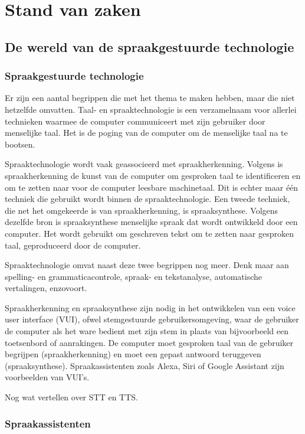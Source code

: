 \chapter{Stand van zaken}
\label{ch:stand-van-zaken}
\section{De wereld van de spraakgestuurde technologie}
\subsection{Spraakgestuurde technologie}
Er zijn een aantal begrippen die met het thema te maken hebben, maar die niet hetzelfde omvatten. Taal- en spraaktechnologie is een verzamelnaam voor allerlei technieken waarmee de computer communiceert met zijn gebruiker door menselijke taal.\autocite{Taalunie2017} Het is de poging van de computer om de menselijke taal na te bootsen.

Spraaktechnologie wordt vaak geassocieerd met spraakherkenning. Volgens \autocite{Rouse2016} is spraakherkenning de kunst van de computer om gesproken taal te identificeren en om te zetten naar voor de computer leesbare machinetaal. Dit is echter maar één techniek die gebruikt wordt binnen de spraaktechnologie. Een tweede techniek, die net het omgekeerde is van spraakherkenning, is spraaksynthese. Volgens dezelfde bron is spraaksynthese menselijke spraak dat wordt ontwikkeld door een computer. Het wordt gebruikt om geschreven tekst om te zetten naar gesproken taal, geproduceerd door de computer.

Spraaktechnologie omvat naast deze twee begrippen nog meer. Denk maar aan spelling- en grammaticacontrole, spraak- en tekstanalyse, automatische vertalingen, enzovoort.

Spraakherkenning en spraaksynthese zijn nodig in het ontwikkelen van een voice user interface (VUI), ofwel stemgestuurde gebruikersomgeving, waar de gebruiker de computer als het ware bedient met zijn stem in plaats van bijvoorbeeld een toetsenbord of aanrakingen. De computer moet gesproken taal van de gebruiker begrijpen (spraakherkenning) en moet een gepast antwoord teruggeven (spraaksynthese). Spraakassistenten zoals Alexa, Siri of Google Assistant zijn voorbeelden van VUI's.

Nog wat vertellen over STT en TTS.

\subsection{Spraakassistenten}

